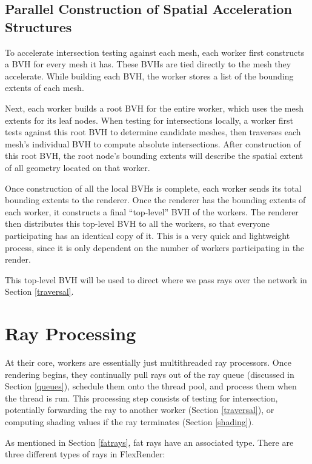 \documentclass[12pt]{ucthesis}
\begin{document}
\subsection{Parallel Construction of Spatial Acceleration Structures}
\label{parallelbvh}

To accelerate intersection testing against each mesh, each worker first
constructs a BVH for every mesh it has. These BVHs are tied directly to the mesh
they accelerate. While building each BVH, the worker stores a list of the bounding
extents of each mesh.

Next, each worker builds a root BVH for the entire worker, which uses the mesh
extents for its leaf nodes. When testing for intersections locally, a worker
first tests against this root BVH to determine candidate meshes, then traverses
each mesh's individual BVH to compute absolute intersections. After construction
of this root BVH, the root node's bounding extents will describe the spatial
extent of all geometry located on that worker.

Once construction of all the local BVHs is complete, each worker sends its
total bounding extents to the renderer. Once the renderer has the bounding
extents of each worker, it constructs a final ``top-level'' BVH of the workers.
The renderer then distributes this top-level BVH to all the workers, so that
everyone participating has an identical copy of it. This is a very quick and
lightweight process, since it is only dependent on the number of workers
participating in the render.

This top-level BVH will be used to direct where we pass rays over the network
in Section \ref{traversal}.

\section{Ray Processing}
\label{process}

At their core, workers are essentially just multithreaded ray processors. Once
rendering begins, they continually pull rays out of the ray queue (discussed in
Section \ref{queues}), schedule them onto the thread pool, and process them
when the thread is run. This processing step consists of testing for intersection,
potentially forwarding the ray to another worker (Section \ref{traversal}),
or computing shading values if the ray terminates (Section \ref{shading}).

As mentioned in Section \ref{fatrays}, fat rays have an associated type. There
are three different types of rays in FlexRender:
\end{document}
